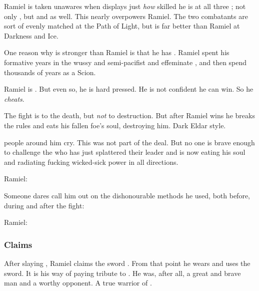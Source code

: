 Ramiel is taken unawares when \Dasteron{} displays just \emph{how} skilled he is at all three ; not only , but  and  as well. 
This nearly overpowers Ramiel. 
The two combatants are sort of evenly matched at the Path of Light, but \Dasteron{} is far better than Ramiel at Darkness and Ice. 

One reason why \Dasteron{} is stronger than Ramiel is that he has .  
Ramiel spent his formative years in the wussy and semi-pacifist and effeminate \Merkyrah{}, and then spend thousands of years  as a Scion.  

Ramiel is . 
But even so, he is hard pressed. 
He is not confident he can win. 
So he \emph{cheats}. 

The fight is to the death, but \emph{not} to destruction. 
But after Ramiel wins he breaks the rules and eats his fallen foe's soul, destroying him. 
Dark Eldar style. 

 people around him cry. 
This was not part of the deal.
But no one is brave enough to challenge the \sathariah{} who has just splattered their leader and is now eating his soul and radiating fucking wicked-sick \sathariah{} power in all directions. 

Ramiel: 

Someone dares call him out on the dishonourable methods he used, both before, during and after the fight: 

Ramiel:





\subsubsection{Claims \Scaleron}
After slaying \Dasteron, Ramiel claims the sword \Scaleron. 
From that point he wears and uses the sword. 
It is his way of paying tribute to \Dasteron. 
He was, after all, a great and brave man and a worthy opponent. 
A true warrior of \Mystraacht. 

